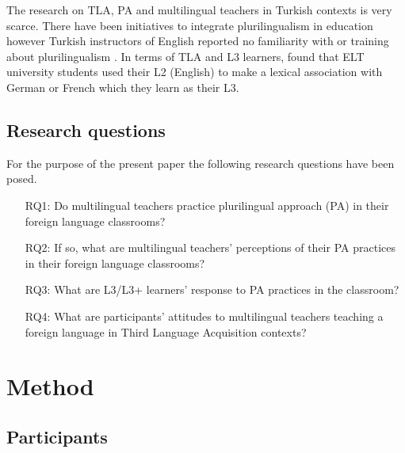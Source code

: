 \documentclass[output=paper]{../langscibook}
\begin{document}
The research on TLA, PA and multilingual teachers in Turkish contexts is very scarce. There have been initiatives to integrate plurilingualism in education \citep{Mirici2008} however Turkish instructors of English reported no familiarity with or training about plurilingualism \citep{Celik2013}. In terms of TLA and L3 learners, \citet{Korkmaz2013} found that ELT university students used their L2 (English) to make a lexical association with German or French which they learn as their L3.



\subsection{Research questions}

For the purpose of the present paper the following research questions have been posed.

\begin{itemize}
\item [RQ1:] Do multilingual teachers practice plurilingual approach (PA) in their foreign language classrooms?
\item [RQ2:] If so, what are multilingual teachers’ perceptions of their PA practices in their foreign language classrooms?
\item [RQ3:] What are L3/L3+ learners’ response to PA practices in the classroom?
\item [RQ4:] What are participants’ attitudes to multilingual teachers teaching a foreign language in Third Language Acquisition contexts?
\end{itemize}


\section{Method}


\subsection{Participants}
\end{document}
